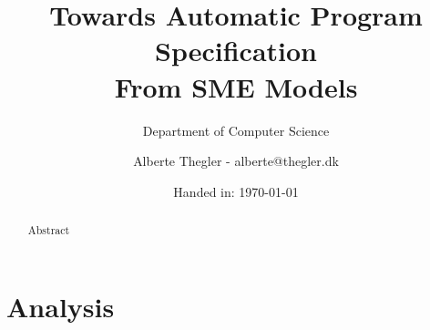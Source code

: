 \documentclass[a4paper]{report}
\author{Alberte Thegler - alberte@thegler.dk}
\title{Towards Automatic Program Specification \\ From SME Models}
\subtitle{Department of Computer Science}
\date{Handed in: \today}
\begin{document}
\maketitle

\begin{abstract}
\begin{doublespace}
Abstract

\end{doublespace}
\end{abstract}



\newpage
\tableofcontents
%
%
\newpage
{}


% 
% 
% 
% 
% 
% 
% 
% 

% 
%
%
% 
%
% 
%
% 

\chapter{Analysis}

\end{document}
